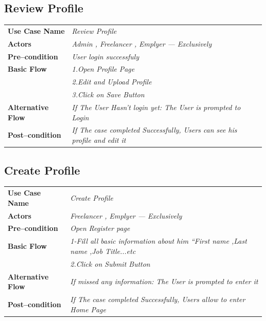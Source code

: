 \documentclass{article}
\begin{document}
	\subsection{Review Profile}
    \begin{tabular}{ l | l }
    \toprule
      \rowcolor{LightCyan}
      \textbf{Use Case Name}    & \textit{Review Profile}\\
      \textbf{Actors}           & \textit{ Admin , Freelancer  , Emplyer --- Exclusively}\\
      \rowcolor{LightCyan}
      \textbf{Pre--condition}   & \textit{User  login successfuly} \\
      \rowcolor{LightCyan}
      \textbf{Basic Flow}       & \textit{1.Open Profile Page}\\
                                & \textit{2.Edit and Upload Profile}\\
                                & \textit{3.Click on Save Button}\\
								
	  \rowcolor{LightCyan}
      \textbf{	Alternative Flow}     
								& \textit{  If The User Hasn't login yet:
											 The User is prompted to Login  }\\
											
 
								
      \rowcolor{LightCyan}
      \textbf{Post--condition}  & \textit{  If The case completed Successfully, Users can see his profile and edit it 
}\\
    \toprule
    \end{tabular}
			
			
	\subsection{ Create Profile }
    \begin{tabular}{ l | l }
    \toprule
      \rowcolor{LightCyan}
      \textbf{Use Case Name}    & \textit{ Create Profile }\\
      \textbf{Actors}           & \textit{ Freelancer  , Emplyer --- Exclusively}\\
      \rowcolor{LightCyan}
      \textbf{Pre--condition}   & \textit{Open Register page} \\
      \rowcolor{LightCyan}
      \textbf{Basic Flow}       & \textit{1-Fill all basic information about him “First name ,Last name ,Job Title...etc}\\
                                & \textit{2.Click on Submit Button}\\
                             
								
	  \rowcolor{LightCyan}
      \textbf{	Alternative Flow}     
								& \textit{ If  missed any information:
											 The User is prompted to enter it  }\\
											
 
								
      \rowcolor{LightCyan}
      \textbf{Post--condition}  & \textit{  If The case completed Successfully, Users allow  to enter Home Page}\\
    \toprule
    \end{tabular}
			
\end{document}
